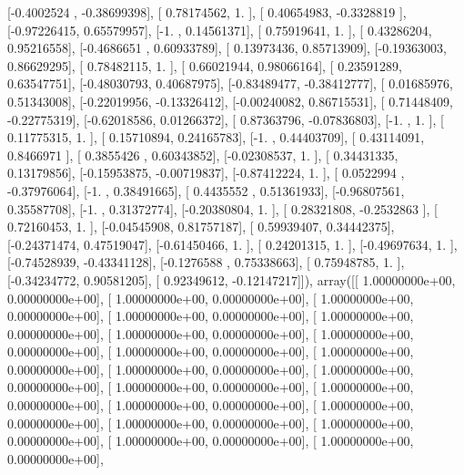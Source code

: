 \documentclass{article}
\begin{document}
       [-0.4002524 , -0.38699398],
       [ 0.78174562,  1.        ],
       [ 0.40654983, -0.3328819 ],
       [-0.97226415,  0.65579957],
       [-1.        ,  0.14561371],
       [ 0.75919641,  1.        ],
       [ 0.43286204,  0.95216558],
       [-0.4686651 ,  0.60933789],
       [ 0.13973436,  0.85713909],
       [-0.19363003,  0.86629295],
       [ 0.78482115,  1.        ],
       [ 0.66021944,  0.98066164],
       [ 0.23591289,  0.63547751],
       [-0.48030793,  0.40687975],
       [-0.83489477, -0.38412777],
       [ 0.01685976,  0.51343008],
       [-0.22019956, -0.13326412],
       [-0.00240082,  0.86715531],
       [ 0.71448409, -0.22775319],
       [-0.62018586,  0.01266372],
       [ 0.87363796, -0.07836803],
       [-1.        ,  1.        ],
       [ 0.11775315,  1.        ],
       [ 0.15710894,  0.24165783],
       [-1.        ,  0.44403709],
       [ 0.43114091,  0.8466971 ],
       [ 0.3855426 ,  0.60343852],
       [-0.02308537,  1.        ],
       [ 0.34431335,  0.13179856],
       [-0.15953875, -0.00719837],
       [-0.87412224,  1.        ],
       [ 0.0522994 , -0.37976064],
       [-1.        ,  0.38491665],
       [ 0.4435552 ,  0.51361933],
       [-0.96807561,  0.35587708],
       [-1.        ,  0.31372774],
       [-0.20380804,  1.        ],
       [ 0.28321808, -0.2532863 ],
       [ 0.72160453,  1.        ],
       [-0.04545908,  0.81757187],
       [ 0.59939407,  0.34442375],
       [-0.24371474,  0.47519047],
       [-0.61450466,  1.        ],
       [ 0.24201315,  1.        ],
       [-0.49697634,  1.        ],
       [-0.74528939, -0.43341128],
       [-0.1276588 ,  0.75338663],
       [ 0.75948785,  1.        ],
       [-0.34234772,  0.90581205],
       [ 0.92349612, -0.12147217]]), array([[  1.00000000e+00,   0.00000000e+00],
       [  1.00000000e+00,   0.00000000e+00],
       [  1.00000000e+00,   0.00000000e+00],
       [  1.00000000e+00,   0.00000000e+00],
       [  1.00000000e+00,   0.00000000e+00],
       [  1.00000000e+00,   0.00000000e+00],
       [  1.00000000e+00,   0.00000000e+00],
       [  1.00000000e+00,   0.00000000e+00],
       [  1.00000000e+00,   0.00000000e+00],
       [  1.00000000e+00,   0.00000000e+00],
       [  1.00000000e+00,   0.00000000e+00],
       [  1.00000000e+00,   0.00000000e+00],
       [  1.00000000e+00,   0.00000000e+00],
       [  1.00000000e+00,   0.00000000e+00],
       [  1.00000000e+00,   0.00000000e+00],
       [  1.00000000e+00,   0.00000000e+00],
       [  1.00000000e+00,   0.00000000e+00],
       [  1.00000000e+00,   0.00000000e+00],
       [  1.00000000e+00,   0.00000000e+00],
\end{document}
